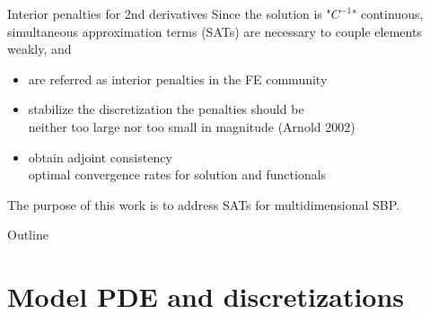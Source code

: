 \documentclass{beamer}
\begin{document}
\begin{frame}{Interior penalties for 2nd derivatives}
    Since the solution is "$C^{-1}$" continuous, simultaneous 
    approximation terms (SATs) are necessary to couple elements weakly, and 
    \begin{itemize}
        \item are referred as interior penalties in the FE community
        \item stabilize the discretization the penalties should be \\ neither too large nor too small in magnitude (Arnold 2002)
        \item obtain adjoint consistency \\
        optimal convergence rates for solution and functionals
        
    \end{itemize}
    \vskip 5mm
    The purpose of this work is to address SATs for multidimensional SBP.
\end{frame}

\begin{frame}{Outline}
    \tableofcontents[hideallsubsections]
\end{frame}

\section{Model PDE and discretizations}
\end{document}
